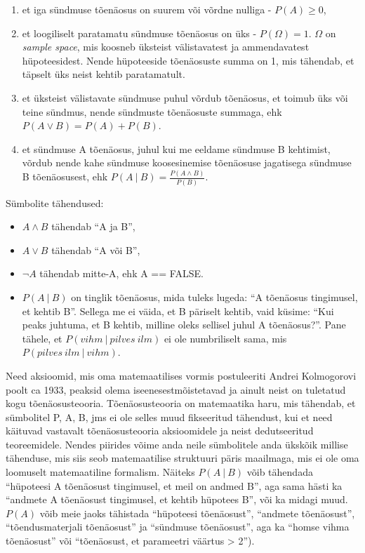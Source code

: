 \documentclass[]{book}
\begin{document}
\begin{enumerate}
\def\labelenumi{(\arabic{enumi})}
\item
  et iga sündmuse tõenäosus on suurem või võrdne nulliga - \(P(A) \geq 0\),
\item
  et loogiliselt paratamatu sündmuse tõenäosus on üks - \(P(\Omega)=1\). \(\Omega\) on \emph{sample space}, mis koosneb üksteist välistavatest ja ammendavatest hüpoteesidest. Nende hüpoteeside tõenäosuste summa on 1, mis tähendab, et täpselt üks neist kehtib paratamatult.
\item
  et üksteist välistavate sündmuse puhul võrdub tõenäosus, et toimub üks või teine sündmus, nende sündmuste tõenäosuste summaga, ehk \(P(A \lor B) = P(A) + P(B)\).
\item
  et sündmuse A tõenäosus, juhul kui me eeldame sündmuse B kehtimist, võrdub nende kahe sündmuse koosesinemise tõenäosuse jagatisega sündmuse B tõenäosusest, ehk \(P(A~\vert~B) = \frac{P(A \land B)}{P(B)}\).
\end{enumerate}

Sümbolite tähendused:

\begin{itemize}
\item
  \(A \land B\) tähendab ``A ja B'',
\item
  \(A \lor B\) tähendab ``A või B'',
\item
  \(\lnot A\) tähendab mitte-A, ehk A == FALSE.
\item
  \(P(A~ \vert ~B)\) on tinglik tõenäosus, mida tuleks lugeda: ``A tõenäosus tingimusel, et kehtib B''. Sellega me ei väida, et B päriselt kehtib, vaid küsime: ``Kui peaks juhtuma, et B kehtib, milline oleks sellisel juhul A tõenäosus?''. Pane tähele, et \(P(vihm~\vert~pilves~ilm)\) ei ole numbriliselt sama, mis \(P(pilves~ilm~\vert~vihm)\).
\end{itemize}

Need aksioomid, mis oma matemaatilises vormis postuleeriti Andrei Kolmogorovi poolt ca 1933, peaksid olema iseenesestmõistetavad ja ainult neist on tuletatud kogu tõenäosusteooria. Tõenäosusteooria on matemaatika haru, mis tähendab, et sümbolitel P, A, B, jms ei ole selles muud fikseeritud tähendust, kui et need käituvad vastavalt tõenäosusteooria aksioomidele ja neist dedutseeritud teoreemidele. Nendes piirides võime anda neile sümbolitele anda ükskõik millise tähenduse, mis siis seob matemaatilise struktuuri päris maailmaga, mis ei ole oma loomuselt matemaatiline formalism. Näiteks \(P(A~\vert~B)\) võib tähendada ``hüpoteesi A tõenäosust tingimusel, et meil on andmed B'', aga sama hästi ka ``andmete A tõenäosust tingimusel, et kehtib hüpotees B'', või ka midagi muud. \(P(A)\) võib meie jaoks tähistada ``hüpoteesi tõenäosust'', ``andmete tõenäosust'', ``tõendusmaterjali tõenäosust'' ja ``sündmuse tõenäosust'', aga ka ``homse vihma tõenäosust'' või ``tõenäosust, et parameetri väärtus \textgreater{} 2'').
\end{document}
